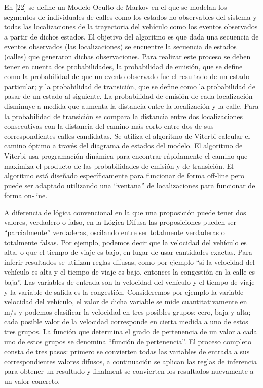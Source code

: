 En [22] se define un Modelo Oculto de Markov en el que se modelan los segmentos de individuales de calles como los estados no observables del sistema y todas las localizaciones de la trayectoria del vehículo como los eventos observados a partir de dichos estados. El objetivo del algoritmo es que dada una secuencia de eventos observados (las localizaciones) se encuentre la secuencia de estados (calles) que generaron dichas observaciones. Para realizar este proceso se deben tener en cuenta dos probabilidades, la probabilidad de emisión, que se define como la probabilidad de que un evento observado fue el resultado de un estado particular; y la probabilidad de transición, que se define como la probabilidad de pasar de un estado al siguiente. La probabilidad de emisión de cada localización disminuye a medida que aumenta la distancia entre la localización y la calle. Para la probabilidad de transición se compara la distancia entre dos localizaciones consecutivas con la distancia del camino más corto entre dos de sus correspondientes calles candidatas. Se utiliza el algoritmo de Viterbi calcular el camino óptimo a través del diagrama de estados del modelo. El algoritmo de Viterbi usa programación dinámica para encontrar rápidamente el camino que maximiza el producto de las probabilidades de emisión y de transición. El algoritmo está diseñado específicamente para funcionar de forma off-line pero puede ser adaptado utilizando una “ventana” de localizaciones para funcionar de forma on-line.

A diferencia de lógica convencional en la que una proposición puede tener dos valores, verdadero o falso, en la Lógica Difusa las proposiciones pueden ser “parcialmente” verdaderas, oscilando entre ser totalmente verdaderas o totalmente falsas. Por ejemplo, podemos decir que la velocidad del vehículo es alta, o que el tiempo de viaje es bajo, en lugar de usar cantidades exactas. Para inferir resultados se utilizan reglas difusas, como por ejemplo “si la velocidad del vehículo es alta y el tiempo de viaje es bajo, entonces la congestión en la calle es baja”. Las variables de entrada son la velocidad del vehículo y el tiempo de viaje y la variable de salida es la congestión. Consideremos por ejemplo la variable velocidad del vehículo, el valor de dicha variable se mide cuantitativamente en m/s y podemos clasificar la velocidad en tres posibles grupos: cero, baja y alta; cada posible valor de la velocidad corresponde en cierta medida a uno de estos tres grupos. La función  que determina el grado de pertenencia de un valor a cada uno de estos grupos se denomina “función de pertenencia”. El proceso completo consta de tres pasos: primero se convierten todas las variables de entrada a sus correspondientes valores difusos, a continuación se aplican las reglas de inferencia para obtener un resultado y finalment se convierten los resultados nuevamente a un valor concreto.

